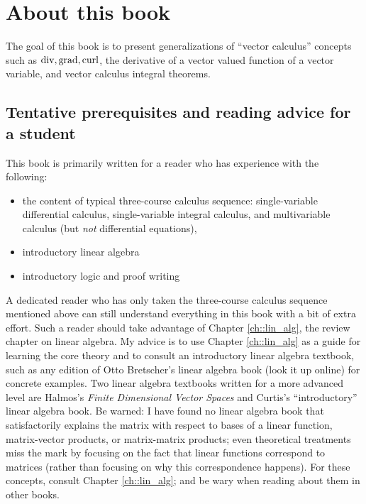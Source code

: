 \chapter*{About this book}

The goal of this book is to present generalizations of ``vector calculus'' concepts such as $\text{div}, \text{grad}, \text{curl}$, the derivative of a vector valued function of a vector variable, and vector calculus integral theorems.

\section*{Tentative prerequisites and reading advice for a student}

This book is primarily written for a reader who has experience with the following:

\begin{itemize}
    \item the content of typical three-course calculus sequence: single-variable differential calculus, single-variable integral calculus, and multivariable calculus (but \textit{not} differential equations),
    \item introductory linear algebra
    \item introductory logic and proof writing
\end{itemize}

A dedicated reader who has only taken the three-course calculus sequence mentioned above can still understand everything in this book with a bit of extra effort. Such a reader should take advantage of Chapter \ref{ch::lin_alg}, the review chapter on linear algebra. My advice is to use Chapter \ref{ch::lin_alg} as a guide for learning the core theory and to consult an introductory linear algebra textbook, such as any edition of Otto Bretscher's linear algebra book (look it up online) for concrete examples. Two linear algebra textbooks written for a more advanced level are Halmos's \textit{Finite Dimensional Vector Spaces} and Curtis's ``introductory'' linear algebra book. Be warned: I have found no linear algebra book that satisfactorily explains the matrix with respect to bases of a linear function, matrix-vector products, or matrix-matrix products; even theoretical treatments miss the mark by focusing on the fact that linear functions correspond to matrices (rather than focusing on why this correspondence happens). For these concepts, consult Chapter \ref{ch::lin_alg}; and be wary when reading about them in other books. 
    
